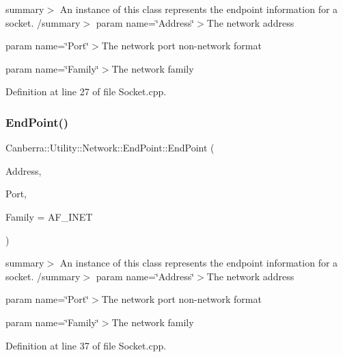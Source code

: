 summary$>$ An instance of this class represents the endpoint information for a socket. /summary$>$ param name=\char`\"{}\+Address\char`\"{}$>$The network address

param name=\char`\"{}\+Port\char`\"{}$>$The network port non-\/network format

param name=\char`\"{}\+Family\char`\"{}$>$The network family

Definition at line 27 of file Socket.\+cpp.

\mbox{\label{class_canberra_1_1_utility_1_1_network_1_1_end_point_a56123403e1f6f6dc03244a5605f34163_a56123403e1f6f6dc03244a5605f34163}} 
\subsubsection{\texorpdfstring{End\+Point()}{EndPoint()}\hspace{0.1cm}{\footnotesize\ttfamily [2/2]}}
{\footnotesize\ttfamily Canberra\+::\+Utility\+::\+Network\+::\+End\+Point\+::\+End\+Point (\begin{DoxyParamCaption}\item[{L\+O\+NG}]{Address,  }\item[{U\+S\+H\+O\+RT}]{Port,  }\item[{S\+H\+O\+RT}]{Family = {\ttfamily AF\+\_\+INET} }\end{DoxyParamCaption})}

summary$>$ An instance of this class represents the endpoint information for a socket. /summary$>$ param name=\char`\"{}\+Address\char`\"{}$>$The network address

param name=\char`\"{}\+Port\char`\"{}$>$The network port non-\/network format

param name=\char`\"{}\+Family\char`\"{}$>$The network family

Definition at line 37 of file Socket.\+cpp.

\mbox{\label{class_canberra_1_1_utility_1_1_network_1_1_end_point_a894bac13908b20ed101915ef380ec93a_a894bac13908b20ed101915ef380ec93a}} 
